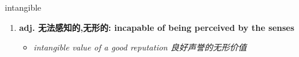 
\begin{frame}
{\huge intangible}
\begin{center}
\begin{enumerate}\Large
  \item \textbf{adj. 无法感知的,无形的: incapable of being perceived by the senses}
  \begin{itemize}
    \item \em{\Large{intangible value of a good reputation 良好声誉的无形价值}}
  \end{itemize}
\end{enumerate}
\end{center}
\end{frame}
